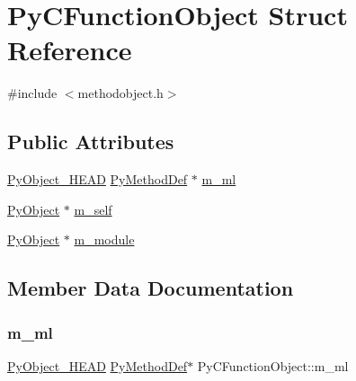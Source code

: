 \hypertarget{struct_py_c_function_object}{}\section{Py\+C\+Function\+Object Struct Reference}
\label{struct_py_c_function_object}


{\ttfamily \#include $<$methodobject.\+h$>$}

\subsection*{Public Attributes}
\begin{DoxyCompactItemize}
\item 
\mbox{\hyperlink{_python27_2object_8h_a0bf35c1f3ea13f925de94d8593db3b7e}{Py\+Object\+\_\+\+H\+E\+AD}} \mbox{\hyperlink{struct_py_method_def}{Py\+Method\+Def}} $\ast$ \mbox{\hyperlink{struct_py_c_function_object_a8e1a57018487c9462d4f4c3c8ff14c8a}{m\+\_\+ml}}
\item 
\mbox{\hyperlink{_python27_2object_8h_aadc84ac7aed2cfa6f20c25f62bf3dac7}{Py\+Object}} $\ast$ \mbox{\hyperlink{struct_py_c_function_object_ad7a57b447920bb7a57224af1ac55383c}{m\+\_\+self}}
\item 
\mbox{\hyperlink{_python27_2object_8h_aadc84ac7aed2cfa6f20c25f62bf3dac7}{Py\+Object}} $\ast$ \mbox{\hyperlink{struct_py_c_function_object_a654330d115976428e8f8230c6a4794be}{m\+\_\+module}}
\end{DoxyCompactItemize}


\subsection{Member Data Documentation}
\mbox{\label{struct_py_c_function_object_a8e1a57018487c9462d4f4c3c8ff14c8a}} 
\subsubsection{\texorpdfstring{m\_ml}{m\_ml}}
{\footnotesize\ttfamily \mbox{\hyperlink{_python27_2object_8h_a0bf35c1f3ea13f925de94d8593db3b7e}{Py\+Object\+\_\+\+H\+E\+AD}} \mbox{\hyperlink{struct_py_method_def}{Py\+Method\+Def}}$\ast$ Py\+C\+Function\+Object\+::m\+\_\+ml}

\mbox{\label{struct_py_c_function_object_a654330d115976428e8f8230c6a4794be}} 
